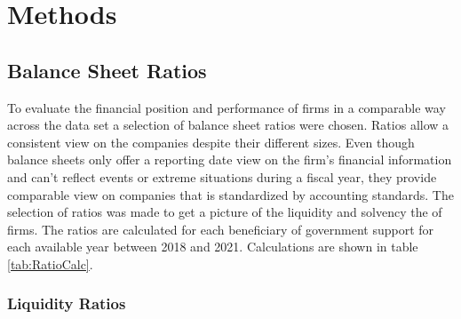 
\chapter{Methods} %

\label{Chapter4} %



\section{Balance Sheet Ratios}
\label{section:BSratios}

To evaluate the financial position and performance of firms in a comparable way across the data set a selection of balance sheet ratios were chosen. Ratios allow a consistent view on the companies despite their different sizes. Even though balance sheets only offer a reporting date view on the firm's financial information and can't reflect events or extreme situations during a fiscal year, they provide comparable view on companies that is standardized by accounting standards.  The selection of ratios was made to get a picture of the liquidity and solvency the of firms. The ratios are calculated for each beneficiary of government support for each available year between 2018 and 2021. Calculations are shown in table \ref{tab:RatioCalc}.

\subsection{Liquidity Ratios}

